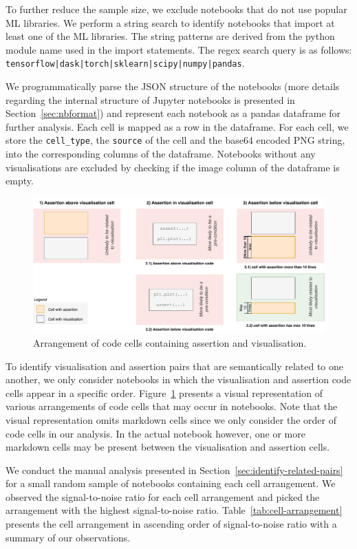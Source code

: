 \documentclass[conference]{IEEEtran}
\begin{document}
To further reduce the sample size, we exclude notebooks that do not use popular ML libraries. We perform a string search to identify notebooks that import at least one of the ML libraries. The string patterns are derived from the python module name used in the import statements. The regex search query is as follows: \texttt{tensorflow|dask|torch|sklearn|scipy|numpy|pandas}.

We programmatically parse the JSON structure of the notebooks (more details regarding the internal structure of Jupyter notebooks is presented in Section~\ref{sec:nbformat}) and represent each notebook as a pandas dataframe for further analysis. Each cell is mapped as a row in the dataframe. For each cell, we store the \texttt{cell\_type}, the \texttt{source} of the cell and the base64 encoded PNG string, into the corresponding columns of the dataframe. Notebooks without any visualisations are excluded by checking if the image column of  the dataframe is empty.

\begin{figure}
  \centering
  \includegraphics[width=\textwidth]{nb-structure.pdf}
  \caption{Arrangement of code cells containing assertion and
    visualisation.}
  \label{fig:cell-arrangement}
\end{figure}

To identify visualisation and assertion pairs that are semantically related to one another, we only consider notebooks in which the visualisation and assertion code cells appear in a specific order. Figure~\ref{fig:cell-arrangement} presents a visual representation of various arrangements of code cells that may occur in notebooks. Note that the visual representation omits markdown cells since we only consider the order of code cells in our analysis. In the actual notebook however, one or more markdown cells may be present between the visualisation and assertion cells.

We conduct the manual analysis presented in Section~\ref{sec:identify-related-pairs} for a small random sample of notebooks containing each cell arrangement. We observed the signal-to-noise ratio for each cell arrangement and picked the arrangement with the highest signal-to-noise ratio. Table~\ref{tab:cell-arrangement} presents the cell arrangement in ascending order of signal-to-noise ratio with a summary of our observations.
\end{document}
